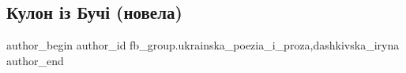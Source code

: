  
 
 
 
 
 
\subsection{Кулон із Бучі (новела)}
\label{sec:21_11_2022.fb.fb_group.ukrainska_poezia_i_proza.2.kulon_iz_buchi}
 
\ifcmt
 author_begin
   author_id fb_group.ukrainska_poezia_i_proza,dashkivska_iryna
 author_end
\fi

